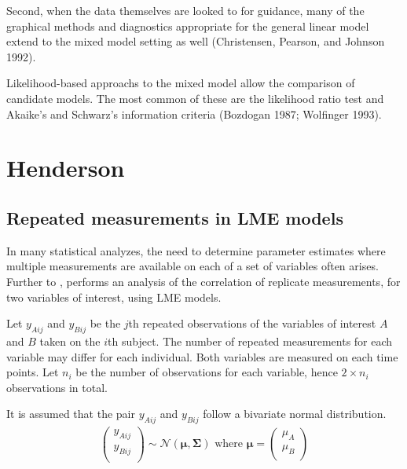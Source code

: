 \documentclass[12pt, a4paper]{report}
\theoremstyle{plain}
\theoremstyle{definition}
\theoremstyle{remark}
\begin{document}
Second, when the data themselves are looked to for guidance, many
of the graphical methods and diagnostics appropriate for the
general linear model extend to the mixed model setting as well
(Christensen, Pearson, and Johnson 1992).

Likelihood-based approachs to the mixed model allow the comparison
of candidate models. The most common of these are the likelihood
ratio test and Akaike's and Schwarz's information criteria
(Bozdogan 1987; Wolfinger 1993).



\chapter{Henderson}




\section{Repeated measurements in LME models}

In many statistical analyzes, the need to determine parameter estimates where multiple measurements are available on each of a set of variables often arises. Further to \citet{lam}, \citet{hamlett} performs an analysis of the correlation of replicate measurements, for two variables of interest, using LME models.

Let $y_{Aij}$ and $y_{Bij}$ be the $j$th repeated observations of the variables of interest $A$ and $B$ taken on the $i$th subject. The number of repeated measurements for each variable may differ for each individual.
Both variables are measured on each time points. Let $n_{i}$ be the number of observations for each variable, hence $2\times n_{i}$ observations in total.

It is assumed that the pair $y_{Aij}$ and $y_{Bij}$ follow a bivariate normal distribution.
\begin{eqnarray*}
	\left(
	\begin{array}{c}
		y_{Aij} \\
		y_{Bij} \\
	\end{array}
	\right) \sim \mathcal{N}(
	\boldsymbol{\mu}, \boldsymbol{\Sigma})\mbox{   where } \boldsymbol{\mu} = \left(
	\begin{array}{c}
		\mu_{A} \\
		\mu_{B} \\
	\end{array}
	\right)
\end{eqnarray*}
\end{document}
